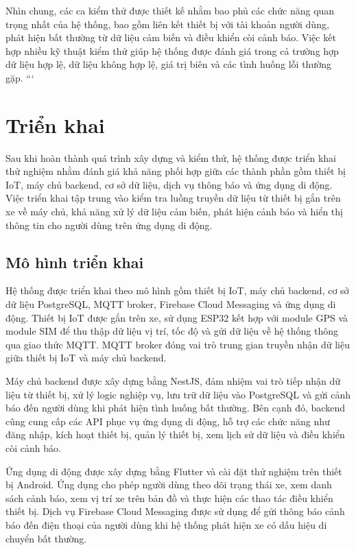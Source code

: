\documentclass[../DoAn.tex]{subfiles}
\begin{document}
Nhìn chung, các ca kiểm thử được thiết kế nhằm bao phủ các chức năng quan trọng nhất của hệ thống, bao gồm liên kết thiết bị với tài khoản người dùng, phát hiện bất thường từ dữ liệu cảm biến và điều khiển còi cảnh báo. Việc kết hợp nhiều kỹ thuật kiểm thử giúp hệ thống được đánh giá trong cả trường hợp dữ liệu hợp lệ, dữ liệu không hợp lệ, giá trị biên và các tình huống lỗi thường gặp.
```

\section{Triển khai}

Sau khi hoàn thành quá trình xây dựng và kiểm thử, hệ thống được triển khai thử nghiệm nhằm đánh giá khả năng phối hợp giữa các thành phần gồm thiết bị IoT, máy chủ backend, cơ sở dữ liệu, dịch vụ thông báo và ứng dụng di động. Việc triển khai tập trung vào kiểm tra luồng truyền dữ liệu từ thiết bị gắn trên xe về máy chủ, khả năng xử lý dữ liệu cảm biến, phát hiện cảnh báo và hiển thị thông tin cho người dùng trên ứng dụng di động.

\subsection{Mô hình triển khai}

Hệ thống được triển khai theo mô hình gồm thiết bị IoT, máy chủ backend, cơ sở dữ liệu PostgreSQL, MQTT broker, Firebase Cloud Messaging và ứng dụng di động. Thiết bị IoT được gắn trên xe, sử dụng ESP32 kết hợp với module GPS và module SIM để thu thập dữ liệu vị trí, tốc độ và gửi dữ liệu về hệ thống thông qua giao thức MQTT. MQTT broker đóng vai trò trung gian truyền nhận dữ liệu giữa thiết bị IoT và máy chủ backend.

Máy chủ backend được xây dựng bằng NestJS, đảm nhiệm vai trò tiếp nhận dữ liệu từ thiết bị, xử lý logic nghiệp vụ, lưu trữ dữ liệu vào PostgreSQL và gửi cảnh báo đến người dùng khi phát hiện tình huống bất thường. Bên cạnh đó, backend cũng cung cấp các API phục vụ ứng dụng di động, hỗ trợ các chức năng như đăng nhập, kích hoạt thiết bị, quản lý thiết bị, xem lịch sử dữ liệu và điều khiển còi cảnh báo.

Ứng dụng di động được xây dựng bằng Flutter và cài đặt thử nghiệm trên thiết bị Android. Ứng dụng cho phép người dùng theo dõi trạng thái xe, xem danh sách cảnh báo, xem vị trí xe trên bản đồ và thực hiện các thao tác điều khiển thiết bị. Dịch vụ Firebase Cloud Messaging được sử dụng để gửi thông báo cảnh báo đến điện thoại của người dùng khi hệ thống phát hiện xe có dấu hiệu di chuyển bất thường.
\end{document}
